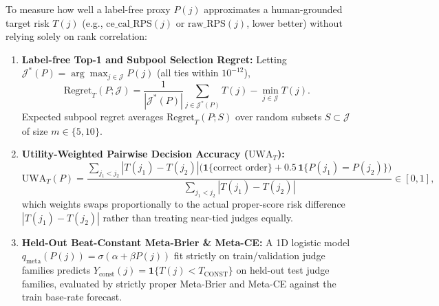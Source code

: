 \documentclass[11pt]{article}
\begin{document}
To measure how well a label-free proxy $P(j)$ approximates a human-grounded target risk $T(j)$ (e.g., $\mathrm{ce\_cal\_RPS}(j)$ or $\mathrm{raw\_RPS}(j)$, lower better) without relying solely on rank correlation:
\begin{enumerate}
\item \textbf{Label-free Top-1 and Subpool Selection Regret:} Letting $\mathcal{J}^*(P) = \arg\max_{j \in \mathcal{J}} P(j)$ (all ties within $10^{-12}$),
\begin{equation}
\mathrm{Regret}_T(P; \mathcal{J}) = \frac{1}{|\mathcal{J}^*(P)|}\sum_{j \in \mathcal{J}^*(P)} T(j) - \min_{j \in \mathcal{J}} T(j).
\end{equation}
Expected subpool regret averages $\mathrm{Regret}_T(P; S)$ over random subsets $S \subset \mathcal{J}$ of size $m \in \{5, 10\}$.
\item \textbf{Utility-Weighted Pairwise Decision Accuracy ($\mathrm{UWA}_T$):}
\begin{equation}
\mathrm{UWA}_T(P) = \frac{\sum_{j_1 < j_2} |T(j_1) - T(j_2)|\bigl(\mathbf{1}\{\text{correct order}\} + 0.5\,\mathbf{1}\{P(j_1)=P(j_2)\}\bigr)}{\sum_{j_1 < j_2} |T(j_1) - T(j_2)|} \in [0, 1],
\end{equation}
which weights swaps proportionally to the actual proper-score risk difference $|T(j_1) - T(j_2)|$ rather than treating near-tied judges equally.
\item \textbf{Held-Out Beat-Constant Meta-Brier \& Meta-CE:} A 1D logistic model $q_{\mathrm{meta}}(P(j)) = \sigma(\alpha + \beta P(j))$ fit strictly on train/validation judge families predicts $Y_{\mathrm{const}}(j) = \mathbf{1}\{T(j) < T_{\mathrm{CONST}}\}$ on held-out test judge families, evaluated by strictly proper Meta-Brier and Meta-CE against the train base-rate forecast.
\end{enumerate}
\end{document}
